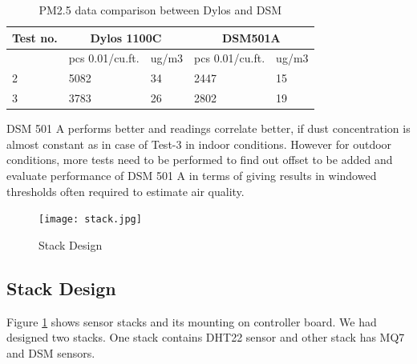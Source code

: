 \documentclass[a4paper,12pt]{article}
\begin{document}


\begin{table}[!ht]

\label{table_1}
\centering
\begin{tabular}{|l|l|l|l|l|}
\hline
\bfseries Test no. & \multicolumn{2}{c}{\bfseries Dylos 1100C} \vline & \multicolumn{2}{c}{\bfseries DSM501A} \vline \\
\hline
& pcs 0.01/cu.ft. & ug/m3 & pcs 0.01/cu.ft. & ug/m3\\
\hline
2 & 5082 & 34 & 2447 & 15\\
\hline
3 & 3783 & 26 & 2802 & 19 \\
\hline

\end{tabular}
\caption{PM2.5 data comparison between Dylos and DSM}
\end{table}

DSM 501 A performs better and readings correlate better, if dust concentration is almost constant as in case of Test-3 in indoor conditions. However for outdoor conditions, more tests need to be performed to find out offset to be added and evaluate performance of DSM 501 A in terms of giving results in windowed thresholds often required to estimate air quality.\cite{PM}

\begin{figure}[!ht]
	\centering
	\texttt{[image: stack.jpg]}
	\caption{Stack Design}
	\label{fig:stack}
\end{figure}

\subsection{Stack Design}
Figure \ref{fig:stack} shows sensor stacks and its mounting on controller board. We had designed two stacks. One stack contains DHT22 sensor and other stack has MQ7 and DSM sensors.
\end{document}
